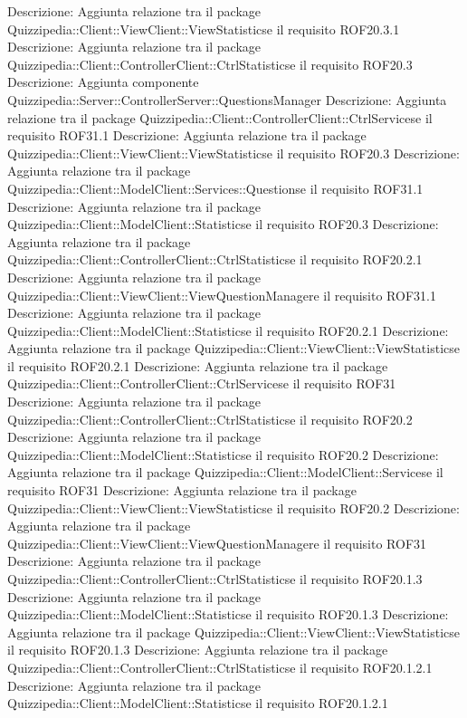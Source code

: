 Descrizione: Aggiunta relazione tra il package Quizzipedia::Client::ViewClient::ViewStatisticse il requisito ROF20.3.1 
Descrizione: Aggiunta relazione tra il package Quizzipedia::Client::ControllerClient::CtrlStatisticse il requisito ROF20.3 
Descrizione: Aggiunta componente Quizzipedia::Server::ControllerServer::QuestionsManager 
Descrizione: Aggiunta relazione tra il package Quizzipedia::Client::ControllerClient::CtrlServicese il requisito ROF31.1 
Descrizione: Aggiunta relazione tra il package Quizzipedia::Client::ViewClient::ViewStatisticse il requisito ROF20.3 
Descrizione: Aggiunta relazione tra il package Quizzipedia::Client::ModelClient::Services::Questionse il requisito ROF31.1 
Descrizione: Aggiunta relazione tra il package Quizzipedia::Client::ModelClient::Statisticse il requisito ROF20.3 
Descrizione: Aggiunta relazione tra il package Quizzipedia::Client::ControllerClient::CtrlStatisticse il requisito ROF20.2.1 
Descrizione: Aggiunta relazione tra il package Quizzipedia::Client::ViewClient::ViewQuestionManagere il requisito ROF31.1 
Descrizione: Aggiunta relazione tra il package Quizzipedia::Client::ModelClient::Statisticse il requisito ROF20.2.1 
Descrizione: Aggiunta relazione tra il package Quizzipedia::Client::ViewClient::ViewStatisticse il requisito ROF20.2.1 
Descrizione: Aggiunta relazione tra il package Quizzipedia::Client::ControllerClient::CtrlServicese il requisito ROF31 
Descrizione: Aggiunta relazione tra il package Quizzipedia::Client::ControllerClient::CtrlStatisticse il requisito ROF20.2 
Descrizione: Aggiunta relazione tra il package Quizzipedia::Client::ModelClient::Statisticse il requisito ROF20.2 
Descrizione: Aggiunta relazione tra il package Quizzipedia::Client::ModelClient::Servicese il requisito ROF31 
Descrizione: Aggiunta relazione tra il package Quizzipedia::Client::ViewClient::ViewStatisticse il requisito ROF20.2 
Descrizione: Aggiunta relazione tra il package Quizzipedia::Client::ViewClient::ViewQuestionManagere il requisito ROF31 
Descrizione: Aggiunta relazione tra il package Quizzipedia::Client::ControllerClient::CtrlStatisticse il requisito ROF20.1.3 
Descrizione: Aggiunta relazione tra il package Quizzipedia::Client::ModelClient::Statisticse il requisito ROF20.1.3 
Descrizione: Aggiunta relazione tra il package Quizzipedia::Client::ViewClient::ViewStatisticse il requisito ROF20.1.3 
Descrizione: Aggiunta relazione tra il package Quizzipedia::Client::ControllerClient::CtrlStatisticse il requisito ROF20.1.2.1 
Descrizione: Aggiunta relazione tra il package Quizzipedia::Client::ModelClient::Statisticse il requisito ROF20.1.2.1 
